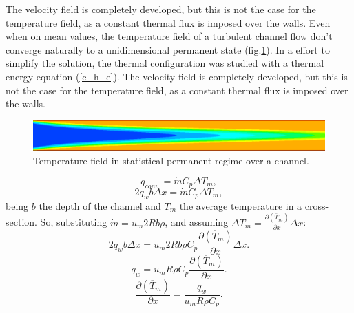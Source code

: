 \documentclass[10pt]{article} %
\begin{document}
The velocity field is completely developed, but this is not the case for the temperature field, as a constant thermal flux is imposed over the walls.
Even when on mean values, the temperature field of a turbulent channel flow don't converge naturally to a unidimensional permanent state (fig.\ref{figure.2}). In a effort to simplify the solution, the thermal configuration was studied with a thermal energy equation (\ref{c_h_e}).
The velocity field is completely developed, but this is not the case for the temperature field, as a constant thermal flux is imposed over the walls.
\begin{figure}[h!]
	\centering
	\includegraphics[angle=0, scale=0.40]{temperatura}
	\caption{Temperature field in statistical permanent regime over a channel.}
	\label{figure.2}
\end{figure}
\begin{equation}\label{c_h_e}
q_{conv.} = \dot{m} C_p \Delta T_m,
\end{equation}
\begin{equation}
2q_w b \Delta x = \dot{m} C_p \Delta T_m,
\end{equation}
being $b$ the depth of the channel and $T_m$ the average temperature in a cross-section. So, substituting $ \dot{m} = u_m 2R b \rho $, and assuming $ \Delta T_m = \frac{\partial{\left(\overline{T}_m\right)}}{\partial{x}} \Delta x $:
\begin{equation}
2q_w b \Delta x = u_m 2R b \rho  C_p \frac{\partial{\left(\overline{T}_m\right)}}{\partial{x}} \Delta x.
\end{equation}     
\begin{equation}
q_w = u_m R \rho  C_p \frac{\partial{\left(\overline{T}_m\right)}}{\partial{x}} .
\end{equation} 
\begin{equation}\label{c_h_ee}
\frac{\partial{\left(\overline{T}_m\right)}}{\partial{x}} = \frac{q_w}{u_m  R \rho  C_p } .
\end{equation} 
\end{document}
